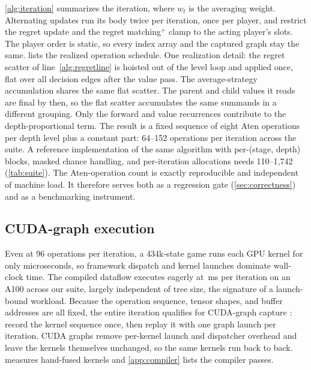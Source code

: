 \cref{alg:iteration} summarizes the iteration, where $w_t$ is the averaging weight.
Alternating updates \cite{burch2019revisiting} run its body twice per iteration,
once per player, and restrict the regret update and the regret matching$^{+}$ clamp
to the acting player's slots. The player order is static, so every index array and
the captured graph stay the same.  lists the realized operation
schedule. One realization detail: the regret scatter of line~\ref{alg:regretline}
is hoisted out of the level loop and applied once, flat over all decision edges after
the value pass. The average-strategy accumulation shares the same flat scatter. The
parent and child values it reads are final by then, so the flat scatter accumulates
the same summands in a different grouping. Only the forward and value recurrences contribute
to the depth-proportional term. The result is a fixed sequence of eight Aten
\cite{paszke2019pytorch} operations per depth level plus a constant part: 64--152
operations per iteration across the suite. A reference implementation of the same
algorithm with per-(stage, depth) blocks, masked chance handling, and per-iteration
allocations needs 110--1{,}742 (\cref{tab:suite}). The Aten-operation count is
exactly reproducible and independent of machine load. It therefore serves both as a
regression gate (\cref{sec:correctness}) and as a benchmarking instrument.



\subsection{CUDA-graph execution}
\label{sec:cudagraph}

Even at 96 operations per iteration, a 434k-state game runs each GPU kernel for only
microseconds, so framework dispatch and kernel launches dominate wall-clock time. The
compiled dataflow executes eagerly at \eagerMsRange\,ms per iteration on an A100
across our suite, largely independent of tree size, the signature of a launch-bound
workload. Because the operation sequence, tensor shapes, and buffer
addresses are all fixed, the entire iteration qualifies for CUDA-graph capture
\cite{guide2020cuda}: record the kernel sequence once, then replay it with one graph
launch per iteration. CUDA graphs remove per-kernel launch and dispatcher overhead
and leave the kernels themselves unchanged, so the same kernels run back to back.
 measures hand-fused kernels and \cref{app:compiler} lists the
compiler passes.

